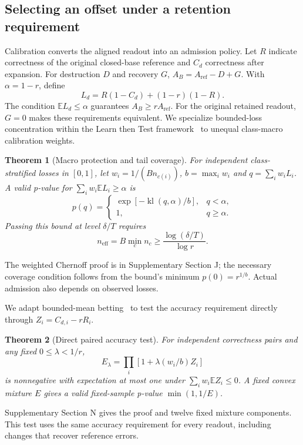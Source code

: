 \documentclass[preprint,review,12pt]{elsarticle}
\newtheorem{theorem}{Theorem}
\begin{document}
\subsection{Selecting an offset under a retention requirement}
\label{sec:riskcontrol}
Calibration converts the aligned readout into an admission policy. Let $R$ indicate correctness of the original closed-base reference and $C_d$ correctness after expansion. For destruction $D$ and recovery $G$, $A_B=A_{\mathrm{ref}}-D+G$. With $\alpha=1-r$, define
\begin{equation}
L_d=R(1-C_d)+(1-r)(1-R).
\label{eq:protectionloss}
\end{equation}
The condition $\mathbb E L_d\leq\alpha$ guarantees $A_B\geq rA_{\mathrm{ref}}$. For the original retained readout, $G=0$ makes these requirements equivalent. We specialize bounded-loss concentration within the Learn then Test framework~\cite{angelopoulos2021ltt} to unequal class-macro calibration weights.

\begin{theorem}[Macro protection and tail coverage]
For independent class-stratified losses in $[0,1]$, let $w_i=1/(Bn_{c(i)})$, $b=\max_i w_i$ and $q=\sum_iw_iL_i$. A valid p-value for $\sum_iw_i\mathbb E L_i\geq\alpha$ is
\begin{equation}
p(q)=\begin{cases}\exp[-\operatorname{kl}(q,\alpha)/b],&q<\alpha,\\1,&q\geq\alpha.\end{cases}
\label{eq:weightedprotection}
\end{equation}
Passing this bound at level $\delta/T$ requires
\begin{equation}
n_{\mathrm{eff}}=B\min_c n_c\geq\frac{\log(\delta/T)}{\log r}.
\label{eq:coveragefloor}
\end{equation}
\label{thm:protection}
\end{theorem}
The weighted Chernoff proof is in Supplementary Section J; the necessary coverage condition follows from the bound's minimum $p(0)=r^{1/b}$. Actual admission also depends on observed losses.

We adapt bounded-mean betting~\cite{waudby2024betting} to test the accuracy requirement directly through $Z_i=C_{d,i}-rR_i$.
\begin{theorem}[Direct paired accuracy test]
For independent correctness pairs and any fixed $0\leq\lambda<1/r$,
\begin{equation}
E_\lambda=\prod_i[1+\lambda(w_i/b)Z_i]
\label{eq:directbet}
\end{equation}
is nonnegative with expectation at most one under $\sum_iw_i\mathbb E Z_i\leq0$. A fixed convex mixture $E$ gives a valid fixed-sample p-value $\min(1,1/E)$.
\label{thm:direct}
\end{theorem}
Supplementary Section N gives the proof and twelve fixed mixture components. This test uses the same accuracy requirement for every readout, including changes that recover reference errors.
\end{document}
